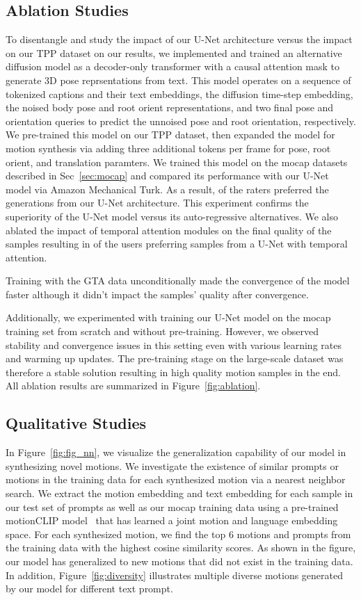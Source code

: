 \documentclass[10pt,twocolumn,letterpaper]{article}
\begin{document}
\subsection{Ablation Studies}
To disentangle and study the impact of our U-Net architecture versus the impact on our TPP dataset on our results, we implemented and trained an alternative diffusion model as a decoder-only transformer with a causal attention mask to generate 3D pose reprsentations from text. This model operates on a sequence of tokenized captions and their text embeddings, the diffusion time-step embedding, the noised body pose and root orient representations, and two final pose and orientation queries to predict
the unnoised pose and root orientation, respectively. We pre-trained this model on our TPP dataset, then expanded the model for motion synthesis via adding three additional tokens per frame for pose, root orient, and translation paramters. We trained this model on the mocap datasets described in Sec~\ref{sec:mocap} and compared its performance with our U-Net model via Amazon Mechanical Turk. As a result,  of the raters preferred the generations from our U-Net architecture. This experiment confirms the superiority of the U-Net model versus its auto-regressive alternatives. We also ablated the impact of temporal attention modules on the final quality of the samples resulting in  of the users preferring samples from a U-Net with temporal attention. 

Training with the GTA data unconditionally made the convergence of the model faster although it didn't impact the samples' quality after convergence. 

Additionally, we experimented with training our U-Net model on the mocap training set from scratch and without pre-training. However, we observed stability and convergence issues in this setting even with various learning rates and warming up updates. The pre-training stage on the large-scale dataset was therefore a stable solution resulting in high quality motion samples in the end. All ablation results are summarized in Figure~\ref{fig:ablation}.



\subsection{Qualitative Studies}
In Figure~\ref{fig:fig_nn}, we visualize the generalization capability of our model in synthesizing novel motions. We investigate the existence of similar prompts or motions in the training data for each synthesized motion via a nearest neighbor search. We extract the motion embedding and text embedding for each sample in our test set of prompts as well as our mocap training data using a pre-trained motionCLIP model~\cite{tevet2022motionclip, kim2022flame} that has learned a joint motion and language embedding space. For each synthesized motion, we find the top 6 motions and prompts from the training data with the highest cosine similarity scores. As shown in the figure, our model has generalized to new motions that did not exist in the training data. In addition, Figure~\ref{fig:diversity} illustrates multiple diverse motions generated by our model for different text prompt.
\end{document}
